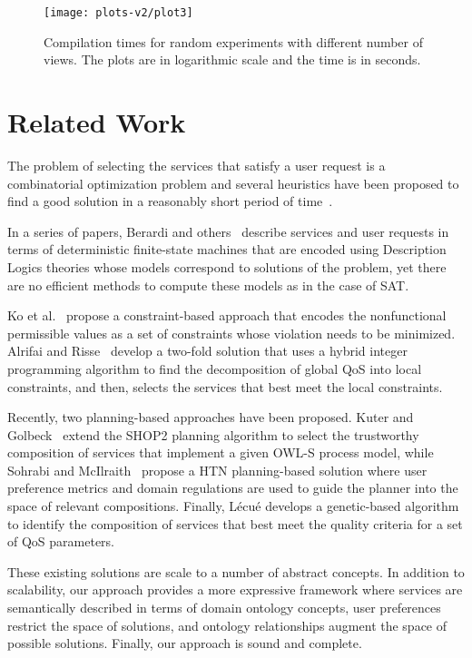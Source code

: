 \documentclass{llncs}
\begin{document}
\begin{figure}[t]
\centering
\texttt{[image: plots-v2/plot3]}
\caption{Compilation times for random experiments with different number of views.
The plots are in logarithmic scale and the time is in seconds. }
\label{fig:random}
\end{figure}

\section{Related Work}

The problem of selecting the services that satisfy a user request is a
combinatorial optimization problem and several heuristics have been
proposed to find a good solution in a reasonably short period of
time~\cite{alrifaiR09,berardi08,myoung08,kuterG09,lecue09,rahmani08,sohrabiM09,Hiroshi2008}.

In a series of papers, Berardi and
others~\cite{berardi05,berardi08,berardi06} describe services and user
requests in terms of deterministic finite-state machines that are
encoded using Description Logics theories whose models correspond to
solutions of the problem, yet there are no efficient methods to compute
these models as in the case of SAT.

Ko et al.~\cite{myoung08} propose a constraint-based approach that encodes
the nonfunctional permissible
values as a set of constraints whose violation needs to
be minimized. Alrifai and Risse~\cite{alrifaiR09} develop a two-fold
solution that uses a hybrid integer programming algorithm to find the
decomposition of global QoS into local constraints, and then, selects
the services that best meet the local constraints.   

Recently, two planning-based approaches have been proposed. Kuter
and Golbeck~\cite{kuterG09} extend the SHOP2 planning algorithm to
select the trustworthy composition of services that implement a given
OWL-S process model, while Sohrabi and McIlraith~\cite{sohrabiM09}
propose a HTN planning-based solution where user preference metrics
and domain regulations are used to guide the planner into the space
of relevant compositions. Finally, L\'ecu\'e \cite{lecue09}  develops
a genetic-based algorithm to identify the composition of services
that best meet the quality criteria for a set of QoS parameters.

These existing solutions are scale to a number of abstract concepts.
In addition to scalability, our approach provides a more expressive
framework where services are semantically
described in terms of domain ontology concepts, user preferences
restrict the space of solutions, and ontology relationships augment
the space of possible solutions. Finally, our approach is sound and
complete.
\end{document}
